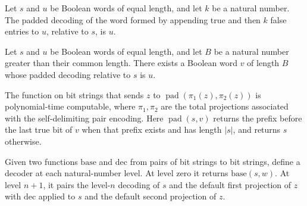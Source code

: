 \begin{theorem}
\label{Complexity.PolyHierarchy.padDecode_marker}
\leanok
{}
Let $s$ and $u$ be Boolean words of equal length, and let $k$ be a natural number. The
padded decoding of the word formed by appending true and then $k$ false entries to $u$,
relative to $s$, is $u$.
\end{theorem}

\begin{theorem}
\label{Complexity.PolyHierarchy.exists_padDecode_eq}
\leanok
{}
Let $s$ and $u$ be Boolean words of equal length, and let $B$ be a natural number
greater than their common length. There exists a Boolean word $v$ of length $B$ whose
padded decoding relative to $s$ is $u$.
\end{theorem}

\begin{theorem}
\label{Complexity.PolyHierarchy.polyTimeComputable_padDecode}
\leanok
{}
The function on bit strings that sends $z$ to $\operatorname{pad}(\pi_1(z),\pi_2(z))$ is
polynomial-time computable, where $\pi_1,\pi_2$ are the total projections associated
with the self-delimiting pair encoding. Here $\operatorname{pad}(s,v)$ returns the
prefix before the last true bit of $v$ when that prefix exists and has length $|s|$, and
returns $s$ otherwise.
\end{theorem}

\begin{definition}
\label{Complexity.PolyHierarchy.tupleDecode}
\leanok
{}
Given two functions $\mathrm{base}$ and $\mathrm{dec}$ from pairs of bit strings to bit
strings, define a decoder at each natural-number level. At level zero it returns
$\mathrm{base}(s,w)$. At level $n+1$, it pairs the level-$n$ decoding of $s$ and the
default first projection of $z$ with $\mathrm{dec}$ applied to $s$ and the default
second projection of $z$.
\end{definition}

